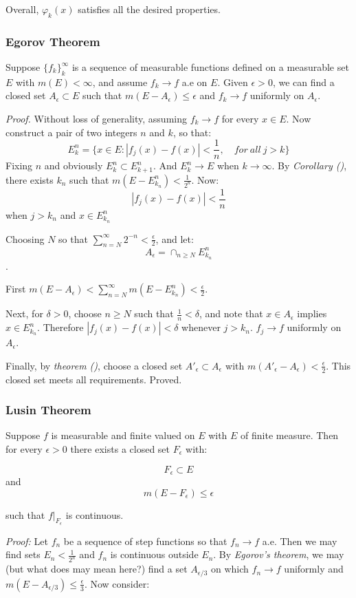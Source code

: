 \documentclass[
]{article}
\begin{document}
Overall, \(\varphi_k(x)\) satisfies all the desired properties.

\subsubsection{Egorov Theorem}
Suppose \(\{f_k\}_k^{\infty}\) is a sequence of measurable functions defined on a
measurable set \(E\) with \(m(E)<\infty\), and assume \(f_k \to f \) a.e on \(E\).
Given \(\epsilon > 0\), we can find a closed set \(A_{\epsilon}\subset E\) such that
\(m(E-A_{\epsilon})\leq \epsilon\) and \(f_k\to f\) uniformly on \(A_{\epsilon}\).

\textit{Proof.} Without loss of generality, assuming \(f_k\to f\) for every \(x\in E\).
Now construct a pair of two integers \(n\) and \(k\), so that:
\[E_k^n = \{x\in E: |f_j(x)-f(x)|<\frac{1}{n},\quad for\ all\ j>k\}\]
Fixing \(n\) and obviously \(E_k^n\subset E_{k+1}^n\). And \(E_k^n \to E\) when \(k\to \infty\).
By \textit{Corollary ()}, there exists \(k_n\) such that \(m(E-E_{k_n}^n)<\frac{1}{2^n}\).
Now:
\[|f_j(x)-f(x)|<\frac{1}{n}\]
when \(j>k_n\) and \(x\in E_{k_n}^n\)

Choosing \(N\) so that \(\sum_{n=N}^{\infty}2^{-n}<\frac{\epsilon}{2}\), and let:
\[A_{\epsilon}=\cap_{n\geq N}E_{k_n}^n\].

First \(m(E-A_{\epsilon})<\sum_{n=N}^{\infty}m(E-E_{k_n}^n)<\frac{\epsilon}{2}\).

Next, for \(\delta>0\), choose \(n\geq N\) such that \(\frac{1}{n}<\delta\), and note that \(x\in A_{\epsilon}\)
implies \(x\in E_{k_n}^n\). Therefore \(|f_j(x)-f(x)| < \delta\) whenever \(j > k_n\). \(f_j\to f\) uniformly on
\(A_{\epsilon}\).

Finally, by \textit{theorem ()}, choose a closed set \(A'_{\epsilon}\subset A_{\epsilon}\) with
\(m(A'_{\epsilon}-A_{\epsilon})<\frac{\epsilon}{2}\). This closed set meets all requirements. Proved.

\subsubsection{Lusin Theorem}
Suppose \(f\) is measurable and finite valued on \(E\) with \(E\) of finite measure. Then for
every \(\epsilon > 0\) there exists a closed set \(F_{\epsilon}\) with:

\[F_{\epsilon} \subset E\] and
\[m(E-F_{\epsilon})\leq \epsilon\]

such that \(f|_{F_{\epsilon}}\) is continuous.

\textit{Proof:} Let \(f_n\) be a sequence of step functions so that \(f_n\to f\) a.e. Then we may
find sets \(E_n < \frac{1}{2^n}\) and \(f_n\) is continuous outside \(E_n\). By \textit{Egorov's theorem},
we may (but what does may mean here?) find a set \(A_{\epsilon/3}\) on which \(f_n\to f\) uniformly and \(m(E-A_{\epsilon/3})\leq \frac{\epsilon}{3}\).
Now consider:
\end{document}
